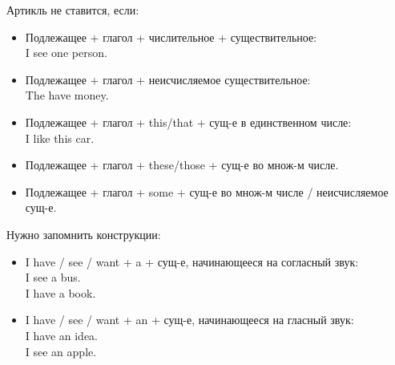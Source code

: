 Артикль не ставится, если:
\begin{itemize}
    \item Подлежащее + глагол + числительное + существительное:\\
          I see one person.
    \item Подлежащее + глагол + неисчисляемое существительное:\\
          The have money.
    \item Подлежащее + глагол + this/that + сущ-е в единственном числе:\\
          I like this car.
    \item Подлежащее + глагол + these/those + сущ-е во множ-м числе.
    \item Подлежащее + глагол + some + сущ-е во множ-м числе / неисчисляемое сущ-е.
\end{itemize}

Нужно запомнить конструкции:
\begin{itemize}
    \item I have / see / want + a + сущ-е, начинающееся на согласный звук:\\
          I see a bus.\\
          I have a book.
    \item I have / see / want + an + сущ-е, начинающееся на гласный звук:\\
          I have an idea.\\
          I see an apple.
\end{itemize}